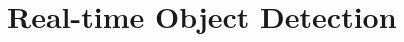 \documentclass{erauthesis}
\begin{document}







\chapter{Real-time Object Detection} \label{realtime_object_detection}

\end{document}
